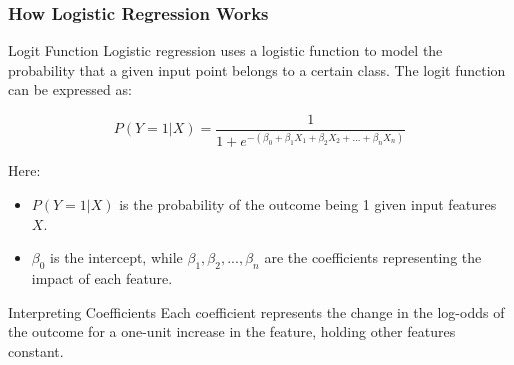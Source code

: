 \documentclass[aspectratio=169]{beamer}
\begin{document}
\begin{frame}[fragile]
    \frametitle{How Logistic Regression Works}
    \begin{block}{Logit Function}
        Logistic regression uses a logistic function to model the probability that a given input point belongs to a certain class. The logit function can be expressed as:

        \begin{equation}
        P(Y=1|X) = \frac{1}{1 + e^{-(\beta_0 + \beta_1X_1 + \beta_2X_2 + ... + \beta_nX_n)}}
        \end{equation}
        
        Here:
        \begin{itemize}
            \item \( P(Y=1|X) \) is the probability of the outcome being 1 given input features \( X \).
            \item \( \beta_0 \) is the intercept, while \( \beta_1, \beta_2, ..., \beta_n \) are the coefficients representing the impact of each feature.
        \end{itemize}
    \end{block}

    \begin{block}{Interpreting Coefficients}
        Each coefficient represents the change in the log-odds of the outcome for a one-unit increase in the feature, holding other features constant.
    \end{block}
\end{frame}
\end{document}
